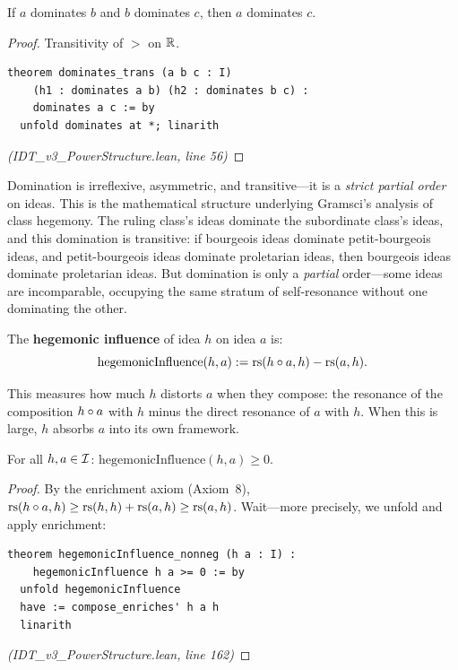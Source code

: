 \begin{theorem}
\label{thm:dominates-trans}
If $a$ dominates $b$ and $b$ dominates $c$, then $a$ dominates $c$.
\end{theorem}

\begin{proof}
Transitivity of $>$ on $\mathbb{R}$.
\begin{lstlisting}
theorem dominates_trans (a b c : I)
    (h1 : dominates a b) (h2 : dominates b c) :
    dominates a c := by
  unfold dominates at *; linarith
\end{lstlisting}
\textit{(IDT\_v3\_PowerStructure.lean, line 56)}
\end{proof}

\begin{interpretation}
Domination is irreflexive, asymmetric, and transitive---it is a \emph{strict
partial order} on ideas. This is the mathematical structure underlying Gramsci's
analysis of class hegemony. The ruling class's ideas dominate the subordinate
class's ideas, and this domination is transitive: if bourgeois ideas dominate
petit-bourgeois ideas, and petit-bourgeois ideas dominate proletarian ideas,
then bourgeois ideas dominate proletarian ideas. But domination is only a
\emph{partial} order---some ideas are incomparable, occupying the same stratum
of self-resonance without one dominating the other.
\end{interpretation}

\begin{definition}
\label{def:hegemonic-influence}
The \textbf{hegemonic influence} of idea $h$ on idea $a$ is:
\[
  \mathrm{hegemonicInfluence}(h, a) := \mathrm{rs}(h \circ a, h) - \mathrm{rs}(a, h).
\]
\end{definition}

This measures how much $h$ distorts $a$ when they compose: the resonance of the
composition $h \circ a$ with $h$ minus the direct resonance of $a$ with $h$.
When this is large, $h$ absorbs $a$ into its own framework.

\begin{theorem}
\label{thm:hegemonic-nonneg}
For all $h, a \in \mathcal{I}$: $\mathrm{hegemonicInfluence}(h, a) \geq 0$.
\end{theorem}

\begin{proof}
By the enrichment axiom (Axiom~8), $\mathrm{rs}(h \circ a, h) \geq \mathrm{rs}(h,h) + \mathrm{rs}(a,h) \geq \mathrm{rs}(a,h)$.
Wait---more precisely, we unfold and apply enrichment:
\begin{lstlisting}
theorem hegemonicInfluence_nonneg (h a : I) :
    hegemonicInfluence h a >= 0 := by
  unfold hegemonicInfluence
  have := compose_enriches' h a h
  linarith
\end{lstlisting}
\textit{(IDT\_v3\_PowerStructure.lean, line 162)}
\end{proof}

